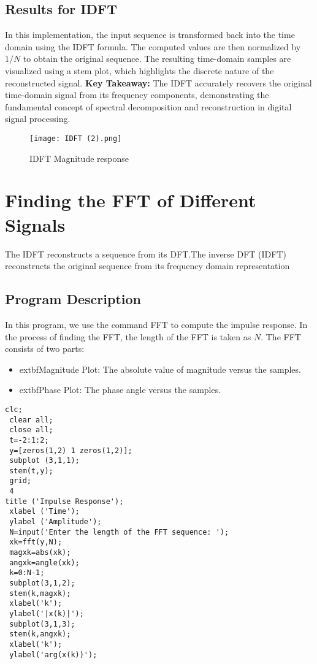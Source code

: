 \documentclass[a4paper,12pt]{article}
\begin{document}
\subsection{Results for IDFT}
In this implementation, the input sequence is transformed back into the time domain using the IDFT formula. The computed values are then normalized by \( 1/N \) to obtain the original sequence. The resulting time-domain samples are visualized using a stem plot, which highlights the discrete nature of the reconstructed signal.
\textbf{Key Takeaway:} The IDFT accurately recovers the original time-domain signal from its frequency components, demonstrating the fundamental concept of spectral decomposition and reconstruction in digital signal processing.
\begin{figure}[h]
    \centering
    \texttt{[image: IDFT (2).png]}
    \caption{IDFT Magnitude response}
    \label{fig:dft_result}
\end{figure}
\section{Finding the FFT of Different Signals}
 The IDFT reconstructs a sequence from its DFT.The inverse DFT (IDFT) reconstructs the original sequence from its frequency domain representation
 
\subsection{Program Description}
In this program, we use the command FFT to compute the impulse response. In the process of finding the FFT, the length of the FFT is taken as $N$. The FFT consists of two parts: 
\begin{itemize}
    \item 	extbf{Magnitude Plot:} The absolute value of magnitude versus the samples.
    \item 	extbf{Phase Plot:} The phase angle versus the samples.
\end{itemize}
\begin{verbatim} 
clc;
 clear all;
 close all;
 t=-2:1:2;
 y=[zeros(1,2) 1 zeros(1,2)];
 subplot (3,1,1);
 stem(t,y);
 grid;
 4
title ('Impulse Response');
 xlabel ('Time');
 ylabel ('Amplitude');
 N=input('Enter the length of the FFT sequence: ');
 xk=fft(y,N);
 magxk=abs(xk);
 angxk=angle(xk);
 k=0:N-1;
 subplot(3,1,2);
 stem(k,magxk);
 xlabel('k');
 ylabel('|x(k)|');
 subplot(3,1,3);
 stem(k,angxk);
 xlabel('k');
 ylabel('arg(x(k))');
\end{verbatim}
\end{document}
